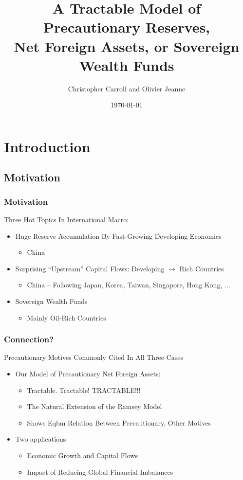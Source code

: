 \documentclass{beamer}
\title[A Tractable Model]{A Tractable Model of Precautionary Reserves, \\ Net Foreign Assets, or Sovereign Wealth Funds}
\author[Carroll, Jeanne]{Christopher Carroll and Olivier Jeanne}
\institute[JHU]{Johns Hopkins University}
\date[\today]{\today}
\begin{document}
\begin{frame}[plain]
  \titlepage
\end{frame}


\section{Introduction}
\subsection{Motivation}

\begin{frame}
\frametitle{Motivation}

Three Hot Topics In International Macro: \pause
\begin{itemize}
\item Huge Reserve Accumulation By Fast-Growing Developing Economies
\begin{itemize}
\item China
\end{itemize}
\item Surprising ``Upstream'' Capital Flows: Developing $\rightarrow$ Rich Countries
\begin{itemize}
\item China -- Following Japan, Korea, Taiwan, Singapore, Hong Kong, ...
\end{itemize}
\item Sovereign Wealth Funds
\begin{itemize}
\item Mainly Oil-Rich Countries
\end{itemize}
\end{itemize}

\end{frame}
\begin{frame}
\frametitle{Connection?}

\pause Precautionary Motives Commonly Cited In All Three Cases

\pause \begin{itemize}
    \item Our Model of Precautionary Net Foreign Assets:
        \begin{itemize}
            \item Tractable. \pause Tractable! \pause \pause TRACTABLE!!!
\pause      \item The Natural Extension of the Ramsey Model
\pause      \item Shows Eqbm Relation Between Precautionary, Other Motives
        \end{itemize}
    \item Two applications
        \begin{itemize}
            \item Economic Growth and Capital Flows
            \item Impact of Reducing Global Financial Imbalances
        \end{itemize}
    \end{itemize}
\end{frame}
\end{document}
